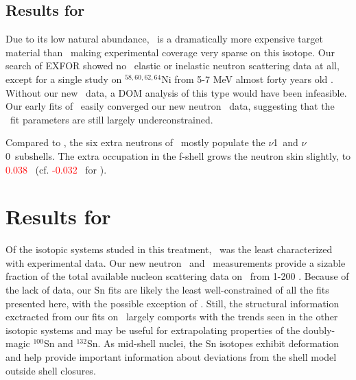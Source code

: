 \subsection{Results for \niFour}
Due to its low natural abundance, \niFour\ is a dramatically more expensive target material than
\niEight\, making experimental coverage very sparse on this isotope. Our search of EXFOR showed
no \niFour\ elastic or inelastic neutron scattering data at all, except for a single study on
$^{58,60,62,64}$Ni from 5-7 MeV almost forty years old \cite{Korzh80}.
Without our new \tot\ data, a DOM analysis of this type would have been infeasible. Our
early fits of \niFour\ easily converged our new neutron \tot\ data, suggesting that the \niFour\
fit parameters are still largely underconstrained.

Compared to \niEight, the six extra neutrons of \niFour\ mostly populate the $\nu$1\pOne\ and
$\nu$0\fFive\ subshells. The extra occupation in the f-shell grows the neutron skin slightly, to 
\textcolor{red}{0.038} \femto\meter\ (cf. \textcolor{red}{-0.032} \femto\meter\ for \niEight).

\section{Results for \snTwelveFour}
Of the isotopic systems studed in this treatment, \snTwelveFour\ was the least characterized with 
experimental data. Our new neutron \tot\ and \el\ measurements provide a sizable fraction
of the total available nucleon scattering data on \snTwelveFour\ from 1-200 \mega\electronvolt.
Because of the lack of data, our Sn fits are likely the least well-constrained of all the fits
presented here, with the possible exception of \niFour.
Still, the structural information exctracted from
our fits on \snTwelveFour\ largely comports with the trends seen in the other isotopic systems and
may be useful for extrapolating properties of the doubly-magic $^{100}$Sn and $^{132}$Sn. As
mid-shell nuclei, the Sn isotopes exhibit deformation and help provide important information
about deviations from the shell model outside shell closures. 
